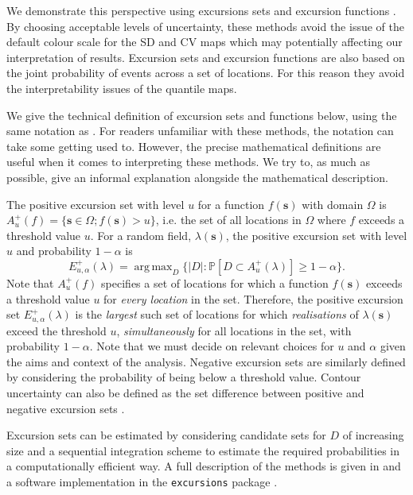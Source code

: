 \documentclass{statsoc}
\newcommand{\bs}{\mathbf{s}}
\DeclareMathOperator*{\argmax}{arg\,max}  %
\begin{document}
We demonstrate this perspective using excursions sets and excursion functions \citep{bolin_excursion_2015}. By choosing acceptable levels of uncertainty, these methods avoid the issue of the default colour scale for the SD and CV maps which may potentially affecting our interpretation of results.  Excursion sets and excursion functions are also based on the joint probability of events across a set of locations.  For this reason they avoid the interpretability issues of the quantile maps.

We give the technical definition of excursion sets and functions below, using the same notation as \cite{bolin_excursion_2015}.  For readers unfamiliar with these methods, the notation can take some getting used to.  However, the precise mathematical definitions are useful when it comes to interpreting these methods.  We try to, as much as possible, give an informal explanation alongside the mathematical description.

The positive excursion set with level $u$ for a function $f(\bs)$ with domain $\Omega$ is $A_u^{+}(f) = \{ \bs \in \Omega ; f(\bs) > u \}$, i.e. the set of all locations in $\Omega$ where $f$ exceeds a threshold value $u$. For a random field, $\lambda(\bs)$, the positive excursion set with level $u$ and probability $1 - \alpha$ is
\begin{equation*}
E_{u,\alpha}^{+}(\lambda) = \argmax_{D}\{\lvert D \rvert : \mathbb{P}\left[D \subset A_u^{+}(\lambda)\right] \geq 1 - \alpha \} .
\end{equation*}
Note that $A_u^{+}(f)$ specifies a set of locations for which a function $f(\bs)$ exceeds a threshold value $u$ for \textit{every location} in the set. Therefore, the positive excursion set $E_{u,\alpha}^{+}(\lambda)$ is the \textit{largest} such set of locations for which \textit{realisations} of $\lambda(\bs)$ exceed the threshold $u$, \textit{simultaneously} for all locations in the set, with probability $1-\alpha$.  Note that we must decide on relevant choices for $u$ and $\alpha$ given the aims and context of the analysis.  Negative excursion sets are similarly defined by considering the probability of being below a threshold value.  Contour uncertainty can also be defined as the set difference between positive and negative excursion sets \citep{bolin_excursion_2015}.

Excursion sets can be estimated by considering candidate sets for $D$ of increasing size and a sequential integration scheme to estimate the required probabilities in a computationally efficient way.  A full description of the methods is given in \cite{bolin_excursion_2015} and a software implementation in the \texttt{excursions} package \citep{bolin_calculating_2018}.  
\end{document}
